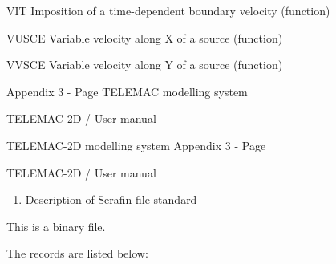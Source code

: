 \documentclass{article} %
\begin{document}
 VIT Imposition of a time-dependent boundary velocity (function)

 VUSCE Variable velocity along X of a source (function)

 VVSCE Variable velocity along Y of a source (function)

 Appendix 3 - Page   TELEMAC modelling system

 TELEMAC-2D / User manual



 TELEMAC-2D modelling system Appendix 3 - Page

 TELEMAC-2D / User manual



\begin{enumerate}
\item   Description of Serafin file standard
\end{enumerate}



 This is a binary file.

 The records are listed below:
\end{document}
